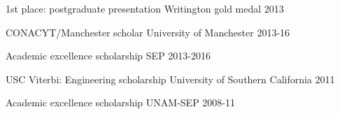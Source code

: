 \begin{cvpress}
\cvpres
{1st place: postgraduate presentation}
{Writington gold medal}
{2013}




\cvpres
{CONACYT/Manchester scholar} %
{University of Manchester} %
{2013-16} %




\cvpres
{Academic excellence scholarship}
{SEP}
{2013-2016}




\cvpres
{USC Viterbi: Engineering scholarship}
{University of Southern California}
{2011}




\cvpres
{Academic excellence scholarship}
{UNAM-SEP}
{2008-11}




\end{cvpress}




